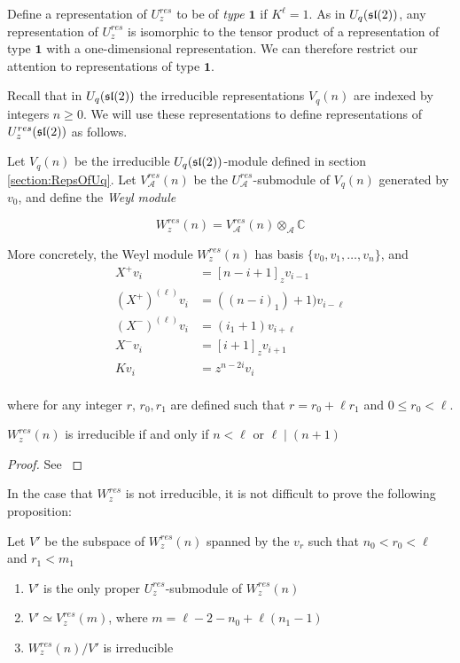 Define a representation of $U_z^{res}$ to be of \emph{type $\mathbf{1}$} if
$K^\ell = 1$. As in $U_q(\mathfrak{sl}(2))$, any representation of $U_z^{res}$ is
isomorphic to the tensor product of a representation of type $\mathbf{1}$ with
a one-dimensional representation. We can therefore restrict our attention to
representations of type $\mathbf{1}$. 

Recall that in $U_q(\mathfrak{sl}(2))$ the irreducible representations $V_q(n)$ are
indexed by integers $n \geq 0$. We will use these representations to define
representations of $U_z^{res}(\mathfrak{sl}(2))$ as follows.

Let $V_q(n)$ be the irreducible $U_q(\mathfrak{sl}(2))$-module defined in section
\ref{section:RepsOfUq}.  Let $V_\mathcal{A}^{res}(n)$ be the
$U_\mathcal{A}^{res}$-submodule of $V_q(n)$ generated by $v_0$, and define the
\emph{Weyl module}

\begin{equation}
    W_z^{res}(n) = V_\mathcal{A}^{res}(n) \otimes_\mathcal{A} \mathbb{C}
\end{equation}


More concretely, the Weyl module $W_z^{res}(n)$ has basis $\{v_0, v_1, \ldots, v_n\}$, and
\begin{align}
    X^+ v_i &= [n-i+1]_z v_{i-1} \\
    (X^+)^{(\ell)} v_i &= ((n-i)_1) + 1) v_{i-\ell} \\
    (X^-)^{(\ell)} v_i &= (i_1 + 1) v_{i+\ell} \\
    X^-v_i &= [i+1]_z v_{i+1} \\
    Kv_i &= z^{n-2i} v_i \\
\end{align}

where for any integer $r$, $r_0,r_1$ are defined such that $r = r_0 + \ell r_1$
and $0 \leq r_0 < \ell$. 

\begin{claim} $W_z^{res}(n)$ is irreducible if and only if $n < \ell$ or $\ell \mid (n+1)$
\end{claim}
\begin{proof}
See \cite{CP}
\end{proof}

In the case that $W_z^{res}$ is not irreducible, it is not difficult to prove the following proposition:

\begin{prop}
Let $V'$ be the subspace of $W_z^{res}(n)$ spanned by the $v_r$ such that $n_0 < r_0 < \ell$ and $r_1 < m_1$
\begin{enumerate}
    \renewcommand{\labelenumi}{\roman{enumi})}
    \item $V'$ is the only proper $U_z^{res}$-submodule of $W_z^{res}(n)$
    \item $V' \simeq V_z^{res}(m)$, where $m = \ell - 2 - n_0 + \ell(n_1 - 1)$
    \item $W_z^{res}(n) / V'$ is irreducible
\end{enumerate}
\end{prop}


